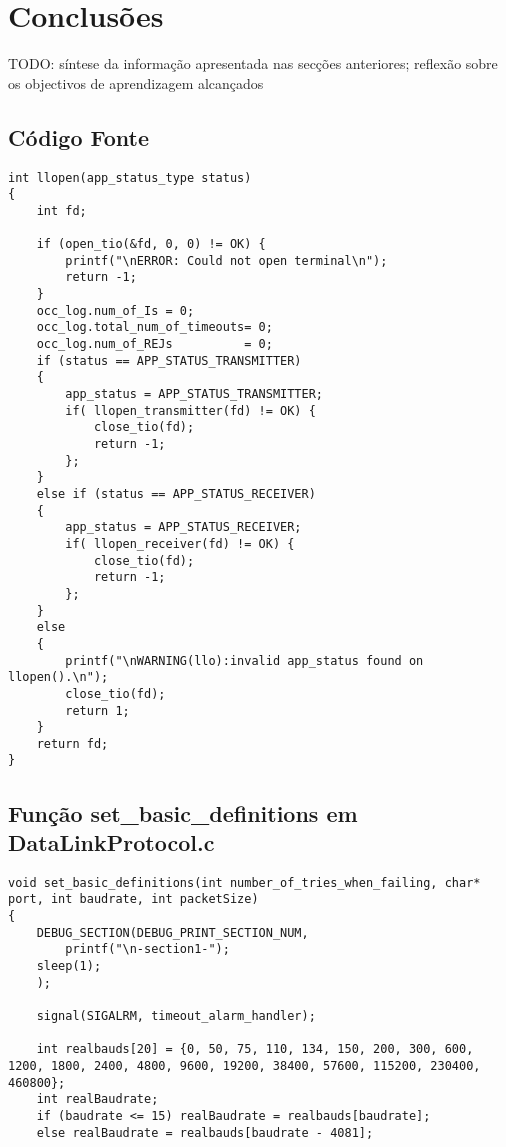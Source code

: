 \documentclass[11pt,a4paper,reqno]{report}
\numberwithin{equation}{section}
\begin{document}
\chapter{Conclusões}

TODO: síntese da informação apresentada nas secções anteriores; reflexão sobre os objectivos de aprendizagem alcançados





\begin{appendices}

\chapter{Código Fonte}

\begin{lstlisting}
int llopen(app_status_type status)
{
	int fd;

	if (open_tio(&fd, 0, 0) != OK) {
		printf("\nERROR: Could not open terminal\n");
		return -1;
	}
	occ_log.num_of_Is = 0;
	occ_log.total_num_of_timeouts= 0;
	occ_log.num_of_REJs			 = 0;
	if (status == APP_STATUS_TRANSMITTER)
	{
		app_status = APP_STATUS_TRANSMITTER;
		if( llopen_transmitter(fd) != OK) {
			close_tio(fd);
			return -1;
		};
	}
	else if (status == APP_STATUS_RECEIVER)
	{
		app_status = APP_STATUS_RECEIVER;
		if( llopen_receiver(fd) != OK) {
			close_tio(fd);
			return -1;
		};
	}
	else
	{
		printf("\nWARNING(llo):invalid app_status found on llopen().\n");
		close_tio(fd);
		return 1;
	}
	return fd;
}
\end{lstlisting}

\section{Função set\_basic\_definitions em DataLinkProtocol.c}
\label{setbasicdefinitions}
\begin{lstlisting}
void set_basic_definitions(int number_of_tries_when_failing, char* port, int baudrate, int packetSize)
{
	DEBUG_SECTION(DEBUG_PRINT_SECTION_NUM,
		printf("\n-section1-");
	sleep(1);
	);

	signal(SIGALRM, timeout_alarm_handler);
	
	int realbauds[20] = {0, 50, 75, 110, 134, 150, 200, 300, 600, 1200, 1800, 2400, 4800, 9600, 19200, 38400, 57600, 115200, 230400, 460800};
	int realBaudrate;
	if (baudrate <= 15) realBaudrate = realbauds[baudrate];
	else realBaudrate = realbauds[baudrate - 4081];
	

\end{lstlisting}
\end{appendices}
\end{document}
